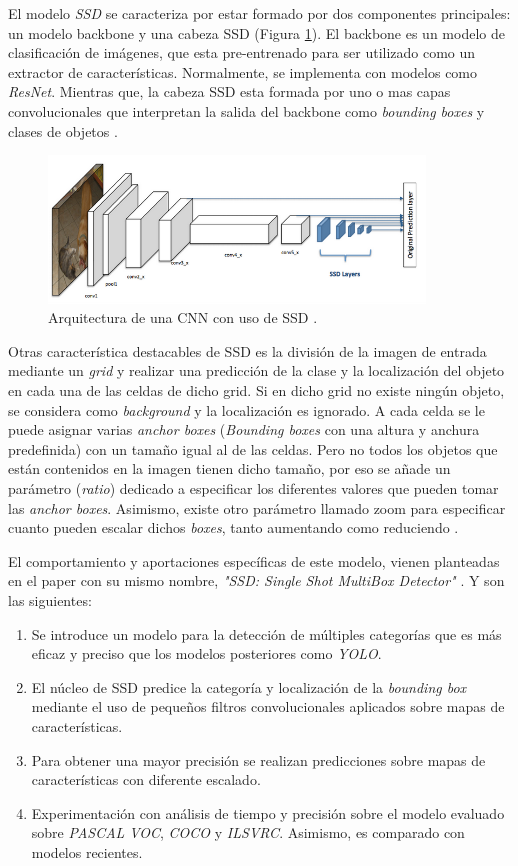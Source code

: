 El modelo \textit{SSD} se caracteriza por estar formado por dos componentes principales: un modelo backbone y una cabeza SSD (Figura \ref{fig:ssd}). El backbone es un modelo de clasificación de imágenes, que esta pre-entrenado para ser utilizado como un extractor de características. Normalmente, se implementa con modelos como \textit{ResNet}. Mientras que, la cabeza SSD esta formada por uno o mas capas convolucionales que interpretan la salida del backbone como \textit{bounding boxes} y clases de objetos \cite{ssdwork}. 

\begin{figure}[htp]
	\centering
	\includegraphics[width=10cm]{imagenes/cnnssd.png}
	\caption{Arquitectura de una CNN con uso de SSD \cite{ssdwork}.}
	\label{fig:ssd}
\end{figure}

Otras característica destacables de SSD es la división de la imagen de entrada mediante un \textit{grid} y realizar una predicción de la clase y la localización del objeto en cada una de las celdas de dicho grid. Si en dicho grid no existe ningún objeto, se considera como \textit{background} y la localización es ignorado. A cada celda se le puede asignar varias \textit{anchor boxes} (\textit{Bounding boxes} con una altura y anchura predefinida) con un tamaño igual al de las celdas. Pero no todos los objetos que están contenidos en la imagen tienen dicho tamaño, por eso se añade un parámetro (\textit{ratio}) dedicado a especificar los diferentes valores que pueden tomar las \textit{anchor boxes}. Asimismo, existe otro parámetro llamado zoom para especificar cuanto pueden escalar dichos \textit{boxes}, tanto aumentando como reduciendo \cite{ssdwork}.

El comportamiento y aportaciones específicas de este modelo, vienen planteadas en el paper con su mismo nombre, \textit{"SSD: Single Shot MultiBox Detector"} \cite{ssd}. Y son las siguientes:

\begin{enumerate}
	\item Se introduce un modelo para la detección de múltiples categorías que es más eficaz y preciso que los modelos posteriores como \textit{YOLO}.
	\item El núcleo de SSD predice la categoría y localización de la \textit{bounding box} mediante el uso de pequeños filtros convolucionales aplicados sobre mapas de características.
	\item Para obtener una mayor precisión se realizan predicciones sobre mapas de características con diferente escalado.
	\item Experimentación con análisis de tiempo y precisión sobre el modelo evaluado sobre \textit{PASCAL VOC}, \textit{COCO} y \textit{ILSVRC}. Asimismo, es comparado con modelos recientes.
\end{enumerate}

